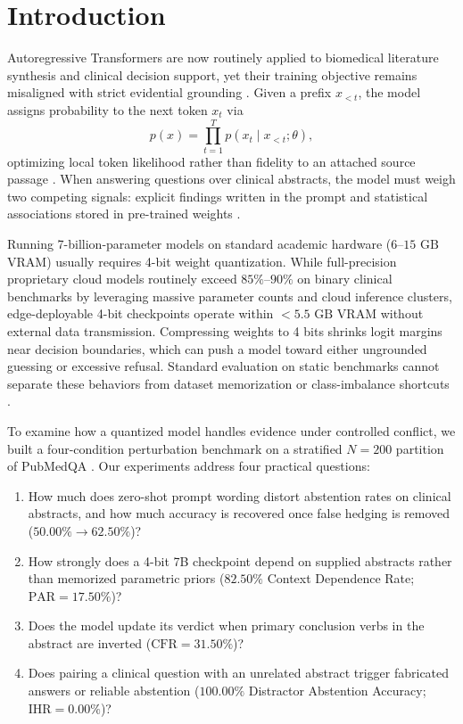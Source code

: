 \documentclass[10pt,twocolumn,letterpaper]{article}
\begin{document}
\section{Introduction}
Autoregressive Transformers \cite{vaswani2017attention} are now routinely applied to biomedical literature synthesis and clinical decision support, yet their training objective remains misaligned with strict evidential grounding \cite{huang2023survey,rawte2023survey}. Given a prefix $x_{<t}$, the model assigns probability to the next token $x_t$ via
\begin{equation}
p(x) = \prod_{t=1}^{T} p(x_t \mid x_{<t}; \theta),
\end{equation}
optimizing local token likelihood rather than fidelity to an attached source passage \cite{ji2023survey}. When answering questions over clinical abstracts, the model must weigh two competing signals: explicit findings written in the prompt and statistical associations stored in pre-trained weights \cite{lin2022truthfulqa}.

Running 7-billion-parameter models on standard academic hardware ($6\text{--}15\text{ GB}$ VRAM) usually requires 4-bit weight quantization. While full-precision proprietary cloud models routinely exceed $85\%\text{--}90\%$ on binary clinical benchmarks by leveraging massive parameter counts and cloud inference clusters, edge-deployable 4-bit checkpoints operate within $<5.5\text{ GB}$ VRAM without external data transmission. Compressing weights to 4 bits shrinks logit margins near decision boundaries, which can push a model toward either ungrounded guessing or excessive refusal. Standard evaluation on static benchmarks cannot separate these behaviors from dataset memorization or class-imbalance shortcuts \cite{sun2024scieval}.

To examine how a quantized model handles evidence under controlled conflict, we built a four-condition perturbation benchmark on a stratified $N=200$ partition of PubMedQA \cite{jin2019pubmedqa}. Our experiments address four practical questions:
\begin{enumerate}
    \item How much does zero-shot prompt wording distort abstention rates on clinical abstracts, and how much accuracy is recovered once false hedging is removed ($50.00\% \to 62.50\%$)?
    \item How strongly does a 4-bit 7B checkpoint depend on supplied abstracts rather than memorized parametric priors ($82.50\%$ Context Dependence Rate; $\text{PAR} = 17.50\%$)?
    \item Does the model update its verdict when primary conclusion verbs in the abstract are inverted ($\text{CFR} = 31.50\%$)?
    \item Does pairing a clinical question with an unrelated abstract trigger fabricated answers or reliable abstention ($100.00\%$ Distractor Abstention Accuracy; $\text{IHR} = 0.00\%$)?
\end{enumerate}
\end{document}
